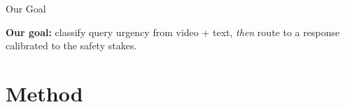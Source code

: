 \documentclass{beamer}
\begin{document}
\begin{frame}{Our Goal}
\vfill
\begin{tcolorbox}[
    colback=ritsumeikan!5,
    colframe=ritsumeikan,
    arc=4mm,
    boxrule=0.8pt,
    left=14pt, right=14pt, top=14pt, bottom=14pt
]
\large
\textbf{Our goal:} classify query urgency from video + text, \textit{then} route to a response calibrated to the safety stakes.
\end{tcolorbox}
\vfill
\end{frame}

\section{Method}
\end{document}
